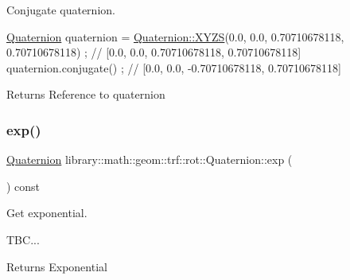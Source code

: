 Conjugate quaternion. 


\begin{DoxyCode}
\hyperlink{classlibrary_1_1math_1_1geom_1_1trf_1_1rot_1_1_quaternion_aa7f459a08f5af38b9f7676a6bf36a21c}{Quaternion} quaternion = \hyperlink{classlibrary_1_1math_1_1geom_1_1trf_1_1rot_1_1_quaternion_afff9523c7dcbfbbc521736121e62ad41}{Quaternion::XYZS}(0.0, 0.0, 0.70710678118, 0.70710678118) 
      ; \textcolor{comment}{// [0.0, 0.0, 0.70710678118, 0.70710678118]}
quaternion.conjugate() ; \textcolor{comment}{// [0.0, 0.0, -0.70710678118, 0.70710678118]}
\end{DoxyCode}


\begin{DoxyReturn}{Returns}
Reference to quaternion 
\end{DoxyReturn}
\mbox{\label{classlibrary_1_1math_1_1geom_1_1trf_1_1rot_1_1_quaternion_a171373818023a1c013891d4297360542}} 
\subsubsection{\texorpdfstring{exp()}{exp()}}
{\footnotesize\ttfamily \hyperlink{classlibrary_1_1math_1_1geom_1_1trf_1_1rot_1_1_quaternion}{Quaternion} library\+::math\+::geom\+::trf\+::rot\+::\+Quaternion\+::exp (\begin{DoxyParamCaption}{ }\end{DoxyParamCaption}) const}



Get exponential. 


\begin{DoxyCode}
TBC...
\end{DoxyCode}


\begin{DoxyReturn}{Returns}
Exponential 
\end{DoxyReturn}
\mbox{\label{classlibrary_1_1math_1_1geom_1_1trf_1_1rot_1_1_quaternion_ac9560aa15c9c4682dd571983bf3f4ab6}} 
